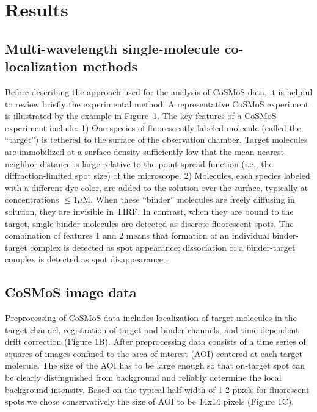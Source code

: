 \section{Results}

\subsection{Multi-wavelength single-molecule co-localization methods}

Before describing the approach used for the analysis of CoSMoS data, it is helpful to  review briefly the experimental method. A representative CoSMoS experiment is illustrated by the example in Figure~1. The key features of a CoSMoS experiment include: 1) One species of fluorescently labeled molecule (called the “target”) is tethered to the surface of the observation chamber. Target molecules are immobilized at a surface density sufficiently low that the mean nearest-neighbor distance is large relative to the point-spread function (i.e., the diffraction-limited spot size) of the microscope. 2) Molecules, each species labeled with a different dye color, are added to the solution over the surface, typically at concentrations $\leq 1 \mu$M. When these “binder” molecules are freely diffusing in solution, they are invisible in TIRF. In contrast, when they are bound to the target, single binder molecules are detected as discrete fluorescent spots. The combination of features 1 and 2 means that formation of an individual binder-target complex is detected as spot appearance; dissociation of a binder-target complex is detected as spot disappearance \cite{Friedman2006-kb, Friedman2015-nx}.

\subsection{CoSMoS image data}

Preprocessing of CoSMoS data includes localization of target molecules in the target channel, registration of target and binder channels, and time-dependent drift correction \cite{Friedman2015-nx, Smith2019-yb} (Figure 1B). After preprocessing data consists of a time series of squares of images confined to the area of interest (AOI) centered at each target molecule. The size of the AOI has to be large enough so that on-target spot can be clearly distinguished from background and  reliably  determine  the  local  background  intensity. Based on the typical half-width of 1-2 pixels for fluorescent spots we chose conservatively the size of AOI to be 14x14 pixels (Figure 1C).

